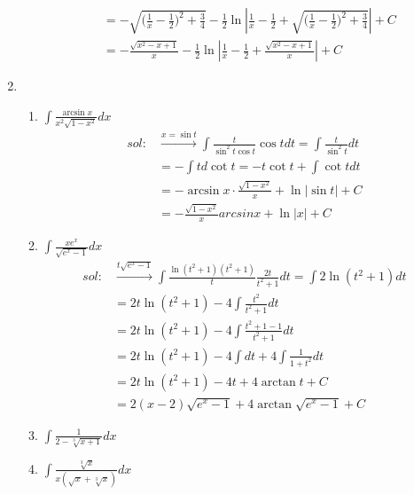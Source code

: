 \begin{enumerate}[{例}1.]
\begin{enumerate}[(1)]
\begin{align*}
                            &=-\sqrt{\bigg(\frac{1}{x}-\frac{1}{2}\bigg)^2+\frac{3}{4}}-\frac{1}{2}\ln\left|\frac{1}{x}-\frac{1}{2}+\sqrt{\bigg(\frac{1}{x}-\frac{1}{2}\bigg)^2+\frac{3}{4}}\right|+C\\
                            &=-\frac{\sqrt{x^2-x+1}}{x}-\frac{1}{2}\ln\left|\frac{1}{x}-\frac{1}{2}+\frac{\sqrt{x^2-x+1}}{x}\right|+C
                    \end{align*}
            \end{enumerate}
    \item   \begin{enumerate}[(1)]
                \item $\int \frac{\arcsin x}{x^2\sqrt{1-x^2}}dx$
                    \begin{align*}
                        sol:&\xrightarrow{x=\sin t}\int\frac{t}{\sin^2 t\cos t}\cos tdt=\int\frac{t}{\sin^2 t}dt\\
                            &=-\int td\cot t=-t\cot t+\int\cot tdt\\
                            &=-\arcsin x\cdot\frac{\sqrt{1-x^2}}{x}+\ln\left|\sin t\right|+C\\
                            &=-\frac{\sqrt{1-x^2}}{x}arcsin x+\ln\left|x\right|+C
                    \end{align*}
                \item $\int \frac{xe^x}{\sqrt{e^x -1}}dx$
                    \begin{align*}
                        sol:&\xrightarrow{t\sqrt{e^x-1}}\int\frac{\ln(t^2+1)(t^2+1)}{t}\frac{2t}{t^2+1}dt=\int 2\ln(t^2+1)dt\\
                            &=2t\ln(t^2+1)-4\int\frac{t^2}{t^2+1}dt\\
                            &=2t\ln(t^2+1)-4\int\frac{t^2+1-1}{t^2+1}dt\\
                            &=2t\ln(t^2+1)-4\int dt+4\int\frac{1}{1+t^2}dt\\
                            &=2t\ln(t^2+1)-4t+4\arctan t+C\\
                            &=2(x-2)\sqrt{e^x-1}+4\arctan\sqrt{e^x-1}+C
                    \end{align*}
                \item $\int \frac{1}{2-\sqrt[3]{x+1}}dx$
                \item $\int \frac{\sqrt[3]{x}}{x(\sqrt{x}+\sqrt[3]{x})}dx$
            \end{enumerate}

\end{enumerate}
